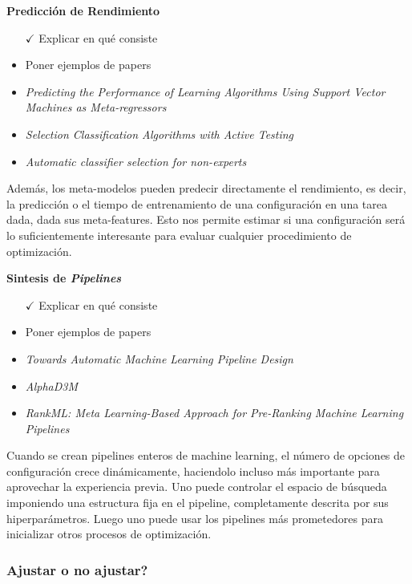 \quad

\textbf{Predicción de Rendimiento}

\begin{itemize}
	\item[$\checkmark$] Explicar en qué consiste
	\item Poner ejemplos de papers
	\item \textit{Predicting the Performance of Learning Algorithms Using Support Vector Machines as Meta-regressors}
	\item \textit{Selection Classification Algorithms with Active Testing}
	\item \textit{Automatic classifier selection for non-experts}
\end{itemize}

\quad

Además, los meta-modelos pueden predecir directamente el rendimiento, es decir, la predicción o el tiempo de entrenamiento de una configuración en una tarea dada, dada sus meta-features. Esto nos permite estimar si una configuración será lo suficientemente interesante para evaluar cualquier procedimiento de optimización.

\quad

\textbf{Sintesis de \textit{Pipelines}}

\begin{itemize}
	\item[$\checkmark$] Explicar en qué consiste
	\item Poner ejemplos de papers
	\item \textit{Towards Automatic Machine Learning Pipeline Design}
	\item \textit{AlphaD3M}
	\item \textit{RankML: Meta Learning-Based Approach for Pre-Ranking Machine Learning Pipelines}
\end{itemize}

\quad

Cuando se crean pipelines enteros de machine learning, el número de opciones de configuración crece dinámicamente, haciendolo incluso más importante para aprovechar la experiencia previa. Uno puede controlar el espacio de búsqueda imponiendo una estructura fija en el pipeline, completamente descrita por sus hiperparámetros. Luego uno puede usar los pipelines más prometedores para inicializar otros procesos de optimización.

\subsubsection{Ajustar o no ajustar?}

